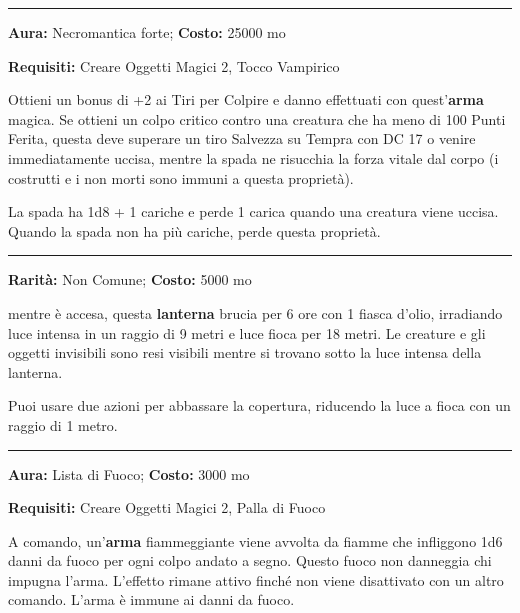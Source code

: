 \begin{multicols}{2}
\smallskip\noindent\rule{\linewidth}{2pt}  \hypertarget{LadradelleNoveVite}{}\medskip{}\noindent\label{LadradelleNoveVite}

\textbf{Aura:} Necromantica forte; \textbf{Costo:} 25000 mo

\textbf{Requisiti:} Creare Oggetti Magici 2, Tocco Vampirico

Ottieni un bonus di +2 ai Tiri per Colpire e danno effettuati con quest'\textbf{arma} magica. Se ottieni un colpo critico contro una creatura che ha meno di 100 Punti Ferita, questa deve superare un tiro Salvezza su Tempra con DC 17 o venire immediatamente uccisa, mentre la spada ne risucchia la forza vitale dal corpo (i costrutti e i non morti sono immuni a questa proprietà).

La spada ha 1d8 + 1 cariche e perde 1 carica quando una creatura viene uccisa. Quando la spada non ha più cariche, perde questa proprietà.

\smallskip\noindent\rule{\linewidth}{2pt}  \hypertarget{LanternadellaRivelazione}{}\medskip{}\noindent\label{LanternadellaRivelazione}

\textbf{Rarità:} Non Comune; \textbf{Costo:} 5000 mo

mentre è accesa, questa \textbf{lanterna} brucia per 6 ore con 1 fiasca d'olio, irradiando luce intensa in un raggio di 9 metri e luce fioca per 18 metri. Le creature e gli oggetti invisibili sono resi visibili mentre si trovano sotto la luce intensa della lanterna.

Puoi usare due azioni per abbassare la copertura, riducendo la luce a fioca con un raggio di 1 metro.

\smallskip\noindent\rule{\linewidth}{2pt}  \hypertarget{Linguadifuoco}{}\medskip{}\noindent\label{Linguadifuoco}

\textbf{Aura:} Lista di Fuoco; \textbf{Costo:} 3000 mo

\textbf{Requisiti:} Creare Oggetti Magici 2, Palla di Fuoco

A comando, un'\textbf{arma} fiammeggiante viene avvolta da fiamme che infliggono 1d6 danni da fuoco per ogni colpo andato a segno. Questo fuoco non danneggia chi impugna l'arma. L'effetto rimane attivo finché non viene disattivato con un altro comando. L'arma è immune ai danni da fuoco.


\end{multicols}
